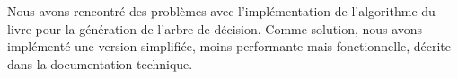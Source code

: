 Nous avons rencontré des problèmes avec l'implémentation de l'algorithme du livre pour la génération de l'arbre de décision.
Comme solution, nous avons implémenté une version simplifiée, moins performante mais fonctionnelle,
décrite dans la documentation technique.

